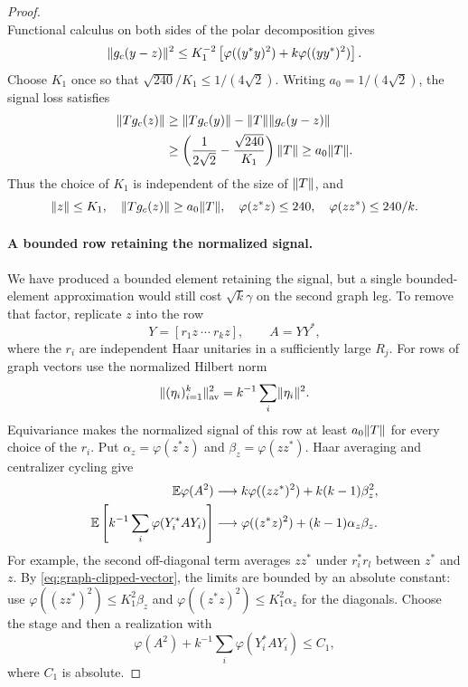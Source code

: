 \begin{proof}
\[\]
Functional calculus on both sides of the polar decomposition gives
\[
 \lVert g_c(y-z)\rVert^2
 \leq K_1^{-2}
 \left[\varphi((y^*y)^2)+k\varphi((yy^*)^2)\right].
\]
Choose $K_1$ once so that $\sqrt{240}/K_1\leq1/(4\sqrt2)$.
Writing $a_0=1/(4\sqrt2)$, the signal loss satisfies
\[
 \begin{aligned}
 \lVert Tg_c(z)\rVert
 &\geq\lVert Tg_c(y)\rVert-\lVert T\rVert\lVert g_c(y-z)\rVert\\
 &\geq\left(\frac1{2\sqrt2}-\frac{\sqrt{240}}{K_1}\right)\lVert T\rVert
 \geq a_0\lVert T\rVert.
 \end{aligned}
\]
Thus the choice of $K_1$ is independent of the size of $\lVert T\rVert$, and
\begin{equation}
 \lVert z\rVert\leq K_1,\quad
 \lVert Tg_c(z)\rVert\geq a_0\lVert T\rVert,\quad
 \varphi(z^*z)\leq240,\quad\varphi(zz^*)\leq240/k.
 \label{eq:graph-clipped-vector}
\end{equation}

\paragraph{A bounded row retaining the normalized signal.}
We have produced a bounded element retaining the signal, but a single
bounded-element approximation would still cost $\sqrt{k}\gamma$ on
the second graph leg.  To remove that factor, replicate $z$ into the row
\[
 Y=[r_1z\ \cdots\ r_kz],\qquad A=YY^*,
\]
where the $r_i$ are independent Haar unitaries in a sufficiently large
$R_j$.  For rows of graph vectors use the normalized Hilbert norm
\[
 \lVert(\eta_i)_{i=1}^k\rVert_{\mathrm{av}}^2
       =k^{-1}\sum_i\lVert\eta_i\rVert^2.
\]
Equivariance makes the normalized signal of this row at least
$a_0\lVert T\rVert$ for every choice of the $r_i$.
Put $\alpha_z=\varphi(z^*z)$ and $\beta_z=\varphi(zz^*)$.
Haar averaging and centralizer cycling give
\begin{align*}
 \mathbb E\varphi(A^2)&\longrightarrow
 k\varphi((zz^*)^2)+k(k-1)\beta_z^2,\\
 \mathbb E\left[k^{-1}\sum_i\varphi(Y_i^*AY_i)\right]
 &\longrightarrow
 \varphi((z^*z)^2)+(k-1)\alpha_z\beta_z.
\end{align*}
For example, the second off-diagonal term averages $zz^*$ under
$r_i^*r_l$ between $z^*$ and $z$.  By
\eqref{eq:graph-clipped-vector}, the limits are bounded by an absolute
constant: use $\varphi((zz^*)^2)\leq K_1^2\beta_z$ and
$\varphi((z^*z)^2)\leq K_1^2\alpha_z$ for the diagonals.
Choose the stage and then a realization with
\begin{equation}
 \varphi(A^2)+k^{-1}\sum_i\varphi(Y_i^*AY_i)\leq C_1,
 \label{eq:graph-row-moments}
\end{equation}
where $C_1$ is absolute.


\end{proof}
